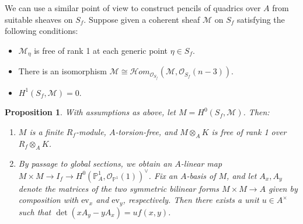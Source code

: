 \documentclass{article} %
\newtheorem{proposition}{Proposition}[section]
\numberwithin{equation}{section}
\newcommand{\bbP}{\mathbb{P}}
\newcommand{\cO}{\mathcal{O}}
\newcommand{\cM}{\mathcal{M}}
\newcommand{\ShHom}{\mathcal{H}\!\mathit{om}}
\begin{document}
We can use a similar point of view to construct pencils of quadrics over $A$ from suitable sheaves on $S_f$. Suppose given a coherent sheaf $\cM$ on $S_f$ satisfying the following conditions:
\begin{itemize}
    \item $\cM_\eta$ is free of rank 1 at each generic point $\eta \in S_f$. 
    \item There is an isomorphism $\cM \cong \ShHom_{\cO_{S_f}}(\cM, \cO_{S_f}(n-3))$.
    \item $H^1(S_f, \cM) = 0$.
\end{itemize}
\begin{proposition}\label{prop_pencil_of_quadrics_over_A}
    With assumptions as above, let $M = H^0(S_f, \cM)$. Then:
    \begin{enumerate}
        \item $M$ is a finite $R_f$-module, $A$-torsion-free, and $M \otimes_A K$ is free of rank 1 over $R_f \otimes_A K$.
        \item By passage to global sections, we obtain an $A$-linear map $M \times M \to I_f \to H^0(\bbP^1_A, \cO_{\bbP^1}(1))^\vee$. Fix an $A$-basis of $M$, and let $A_x, A_y$ denote the matrices of the two symmetric bilinear forms $M \times M \to A$ given by composition with $\mathrm{ev}_x$ and $\mathrm{ev}_y$, respectively. Then there exists a unit $u \in A^\times$ such that $\det( x A_y - y A_x ) = u f(x, y)$. 
    \end{enumerate}
\end{proposition}
\end{document}
